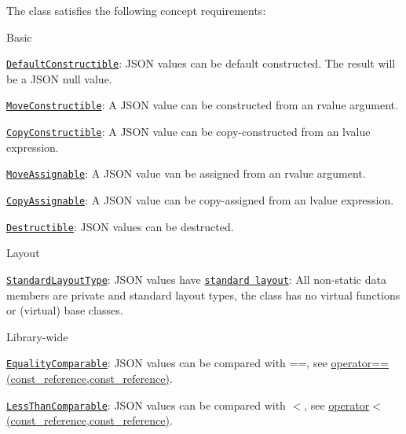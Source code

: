 The class satisfies the following concept requirements\+:
\begin{DoxyItemize}
\item Basic
\begin{DoxyItemize}
\item \href{https://en.cppreference.com/w/cpp/named_req/DefaultConstructible}{\tt Default\+Constructible}\+: J\+S\+ON values can be default constructed. The result will be a J\+S\+ON null value.
\item \href{https://en.cppreference.com/w/cpp/named_req/MoveConstructible}{\tt Move\+Constructible}\+: A J\+S\+ON value can be constructed from an rvalue argument.
\item \href{https://en.cppreference.com/w/cpp/named_req/CopyConstructible}{\tt Copy\+Constructible}\+: A J\+S\+ON value can be copy-\/constructed from an lvalue expression.
\item \href{https://en.cppreference.com/w/cpp/named_req/MoveAssignable}{\tt Move\+Assignable}\+: A J\+S\+ON value van be assigned from an rvalue argument.
\item \href{https://en.cppreference.com/w/cpp/named_req/CopyAssignable}{\tt Copy\+Assignable}\+: A J\+S\+ON value can be copy-\/assigned from an lvalue expression.
\item \href{https://en.cppreference.com/w/cpp/named_req/Destructible}{\tt Destructible}\+: J\+S\+ON values can be destructed.
\end{DoxyItemize}
\item Layout
\begin{DoxyItemize}
\item \href{https://en.cppreference.com/w/cpp/named_req/StandardLayoutType}{\tt Standard\+Layout\+Type}\+: J\+S\+ON values have \href{https://en.cppreference.com/w/cpp/language/data_members#Standard_layout}{\tt standard layout}\+: All non-\/static data members are private and standard layout types, the class has no virtual functions or (virtual) base classes.
\end{DoxyItemize}
\item Library-\/wide
\begin{DoxyItemize}
\item \href{https://en.cppreference.com/w/cpp/named_req/EqualityComparable}{\tt Equality\+Comparable}\+: J\+S\+ON values can be compared with {\ttfamily ==}, see \hyperlink{classnlohmann_1_1basic__json_a122640e7e2db1814fc7bbb3c122ec76e}{operator==(const\+\_\+reference,const\+\_\+reference)}.
\item \href{https://en.cppreference.com/w/cpp/named_req/LessThanComparable}{\tt Less\+Than\+Comparable}\+: J\+S\+ON values can be compared with {\ttfamily $<$}, see \hyperlink{classnlohmann_1_1basic__json_aacd442b66140c764c594ac8ad7dfd5b3}{operator$<$(const\+\_\+reference,const\+\_\+reference)}.

\end{DoxyItemize}
\end{DoxyItemize}
